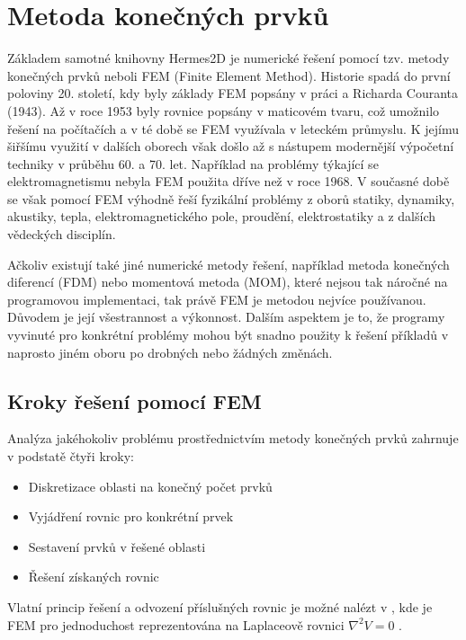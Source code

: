 \section{Metoda konečných prvků}
Základem samotné knihovny Hermes2D je numerické řešení pomocí tzv. metody konečných prvků neboli FEM (Finite Element Method). Historie spadá do první poloviny 20. století, kdy byly základy FEM popsány v práci a Richarda Couranta (1943). Až v roce 1953 byly rovnice popsány v maticovém tvaru, což umožnilo řešení na počítačích a v té době se FEM využívala v leteckém průmyslu. K jejímu šiřšímu využití v dalších oborech však došlo až s nástupem modernější výpočetní techniky v průběhu 60. a 70. let. Například na problémy týkající se elektromagnetismu nebyla FEM použita dříve než v roce 1968. V současné době se však pomocí FEM výhodně řeší fyzikální problémy z oborů statiky, dynamiky, akustiky, tepla, elektromagnetického pole, proudění, elektrostatiky a z dalších vědeckých disciplín. 

Ačkoliv existují také jiné numerické metody řešení, například metoda konečných diferencí (FDM) nebo momentová metoda (MOM), které nejsou tak náročné na programovou implementaci, tak právě FEM je metodou nejvíce používanou. Důvodem je její všestrannost a výkonnost. Dalším aspektem je to, že programy vyvinuté pro konkrétní problémy mohou být snadno použity k řešení příkladů v naprosto jiném oboru po drobných nebo žádných změnách.

\subsection{Kroky řešení pomocí FEM}
Analýza jakéhokoliv problému prostřednictvím metody konečných prvků zahrnuje v podstatě čtyři kroky:
\begin{itemize}
\item {Diskretizace oblasti na konečný počet prvků}
\item {Vyjádření rovnic pro konkrétní prvek}
\item {Sestavení prvků v řešené oblasti}
\item {Řešení získaných rovnic}
\end{itemize}
Vlatní princip řešení a odvození příslušných rovnic je možné nalézt v  \cite[kap. 6.2]{num}, kde je FEM pro jednoduchost reprezentována na Laplaceově rovnici $\nabla^{2}V = 0$ .

